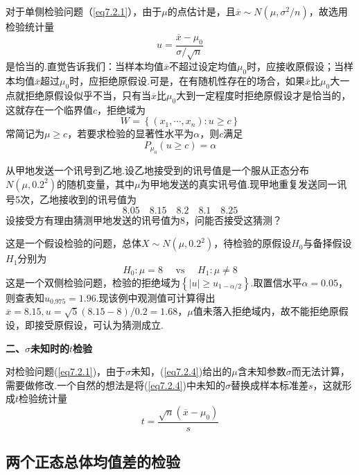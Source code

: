 对于单侧检验问题（\ref{eq7.2.1}），由于$\mu $的点估计是，且$\overline { x } \sim N \left( \mu , \sigma ^ { 2 } / n \right)$，故选用检验统计量
\begin{equation}\label{eq7.2.4}
u = \frac { \overline { x } - \mu _ { 0 } } { \sigma / \sqrt { n } }
\end{equation}
是恰当的.直觉告诉我们：当样本均值$\overline{x}$不超过设定均值$\mu_{ 0 }$时，应接收原假设；当样本均值$\overline{x}$超过$\mu_{ 0 }$时，应拒绝原假设.可是，在有随机性存在的场合，如果$\overline{x}$比$\mu_{ 0 }$大一点就拒绝原假设似乎不当，只有当$\overline{x}$比$\mu_{ 0 }$大到一定程度时拒绝原假设才是恰当的，这就存在一个临界值$c$，拒绝域为
\begin{equation}\label{eq7.2.5}
W = \left\{ \left( x _ { 1 } , \cdots , x _ { n } \right) : u \geq c \right\}
\end{equation}
常简记为${\mu \geq c}$，若要求检验的显著性水平为$\alpha$，则$c$满足
\[P _ { \mu _ { 0 } } ( u \geq c ) = \alpha\]

\begin{example}\label{exam7.2.1}
从甲地发送一个讯号到乙地.设乙地接受到的讯号值是一个服从正态分布$N(\mu ,0.2^{2})$的随机变量，其中$\mu $为甲地发送的真实讯号值.现甲地重复发送同一讯号5次，乙地接收到的讯号值为
\[8.05 \quad 8.15 \quad 8.2 \quad 8.1 \quad 8.25\]
设接受方有理由猜测甲地发送的讯号值为8，问能否接受这猜测？
\end{example}
\begin{solution}
	这是一个假设检验的问题，总体$X \sim N \left( \mu , 0.2 ^ { 2 } \right)$，待检验的原假设$H_{0}$与备择假设$H_{1}$分别为
	\[H _ { 0 } : \mu = 8 \quad \text { vs } \quad H _ { 1 } : \mu \neq 8\]
	这是一个双侧检验问题，检验的拒绝域为$\left\{ | u | \geq u _ { 1 - \alpha / 2} \right\}$.取置信水平$\alpha=0.05$，则查表知$u_{0.975}=1.96$.现该例中观测值可计算得出$\overline{x}=8.15,u=\sqrt{5}\left(8.15-8\right)/0.2=1.68$，$\mu $值未落入拒绝域内，故不能拒绝原假设，即接受原假设，可认为猜测成立.
	
\end{solution}
\textbf{二、$\sigma$未知时的$t$检验}

对检验问题(\ref{eq7.2.1})，由于$\sigma$未知，(\ref{eq7.2.4})给出的$\mu $含未知参数$\sigma$而无法计算，需要做修改.一个自然的想法是将(\ref{eq7.2.4})中未知的$\sigma$替换成样本标准差$s$，这就形成$t$检验统计量
\begin{equation}\label{eq7.2.9}
t = \frac { \sqrt { n } \left( \overline { x } - \mu _ { 0 } \right) } { s }
\end{equation}
\subsection{两个正态总体均值差的检验\label{7.2.2}}


